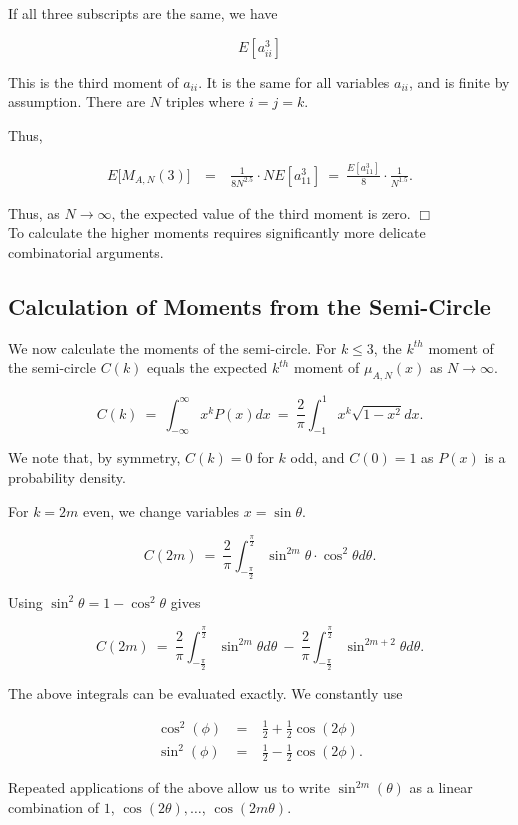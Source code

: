 \documentclass[12pt,letterpaper]{report}
\newcommand\be{\begin{equation}}
\newcommand\ee{\end{equation}}
\newcommand\bea{\begin{eqnarray}}
\newcommand\eea{\end{eqnarray}}
\newcommand{\foh}{\frac{1}{2}}  %
\begin{document}
If all three subscripts are the same, we have

\be E[a_{ii}^3] \ee

This is the third moment of $a_{ii}$. It is the same for all
variables $a_{ii}$, and is finite by assumption. There are $N$
triples where $i = j = k$.

Thus,

\bea E\Big[M_{A,N}(3)\Big] & \ = \ & \frac{1}{8N^{2.5}} \cdot N
E[a_{11}^3] \ = \ \frac{E[a_{11}^3]}{8} \cdot \frac{1}{N^{1.5}}.
\eea

Thus, as $N \to \infty$, the expected value of the third moment is
zero. $\Box$ \\

To calculate the higher moments requires significantly more
delicate combinatorial arguments.

\subsection{Calculation of Moments from the Semi-Circle}

We now calculate the moments of the semi-circle. For $k \le 3$,
the $k^{th}$ moment of the semi-circle $C(k)$ equals the expected
$k^{th}$ moment of $\mu_{A,N}(x)$ as $N \to \infty$.

\be C(k) \ = \ \int_{-\infty}^\infty x^k P(x)dx \ = \
\frac{2}{\pi}\int_{-1}^1 x^k \sqrt{1 - x^2}dx. \ee

We note that, by symmetry, $C(k) = 0$ for $k$ odd, and $C(0) = 1$
as $P(x)$ is a probability density.

For $k = 2m$ even, we change variables $x = \sin \theta$.

\be C(2m) \ = \ \frac{2}{\pi}\int_{-\frac{\pi}{2}}^{\frac{\pi}{2}}
\sin^{2m} \theta \cdot \cos^2 \theta d\theta. \ee

Using $\sin^2 \theta = 1 - \cos^2 \theta$ gives

\be C(2m) \ = \ \frac{2}{\pi}\int_{-\frac{\pi}{2}}^{\frac{\pi}{2}}
\sin^{2m} \theta d\theta \ - \ \frac{2}{\pi}
\int_{-\frac{\pi}{2}}^{\frac{\pi}{2}} \sin^{2m+2} \theta d\theta.
\ee

The above integrals can be evaluated exactly. We constantly use

\bea \cos^2(\phi) & \ = \ & \foh + \foh \cos(2\phi) \nonumber\\
\sin^2(\phi) & \ = \ & \foh - \foh \cos(2\phi). \eea

Repeated applications of the above allow us to write
$\sin^{2m}(\theta)$ as a linear combination of $1$,
$\cos(2\theta), \dots$, $\cos(2m\theta)$.
\end{document}
